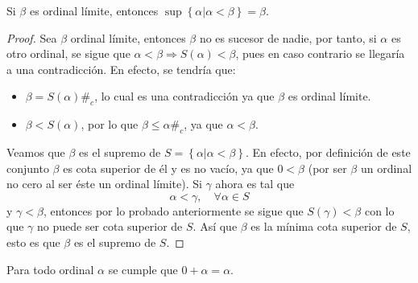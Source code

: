 \documentclass[12pt]{article}
\newcounter{it}
\theoremstyle{largebreak}
\newcommand\contradiction{\ensuremath{\#_c}}
\begin{document}
    \begin{lema}
        Si $\beta$ es ordinal límite, entonces $\sup\left\{\alpha\Big|\alpha<\beta\right\}=\beta$.
    \end{lema}

    \begin{proof}
        Sea $\beta$ ordinal límite, entonces $\beta$ no es sucesor de nadie, por tanto, si $\alpha$ es otro ordinal, se sigue que $\alpha<\beta\Rightarrow S(\alpha)<\beta$, pues en caso contrario se llegaría a una contradicción. En efecto, se tendría que:
        \begin{itemize}
            \item $\beta=S(\alpha)$\contradiction, lo cual es una contradicción ya que $\beta$ es ordinal límite.
            \item $\beta<S(\alpha)$, por lo que $\beta\leq\alpha$\contradiction, ya que $\alpha<\beta$.
        \end{itemize}
        Veamos que $\beta$ es el supremo de $S=\left\{\alpha\Big|\alpha<\beta \right\}$. En efecto, por definición de este conjunto $\beta$ es cota superior de él y es no vacío, ya que $0<\beta$ (por ser $\beta$ un ordinal no cero al ser éste un ordinal límite). Si $\gamma$ ahora es tal que
        \begin{equation*}
            \alpha<\gamma,\quad\forall\alpha\in S
        \end{equation*}
        y $\gamma<\beta$, entonces por lo probado anteriormente se sigue que $S(\gamma)<\beta$ con lo que $\gamma$ no puede ser cota superior de $S$. Así que $\beta$ es la mínima cota superior de $S$, esto es que $\beta$ es el supremo de $S$.
    \end{proof}

    \begin{propo}
        Para todo ordinal $\alpha$ se cumple que $0+\alpha=\alpha$.
    \end{propo}
\end{document}
